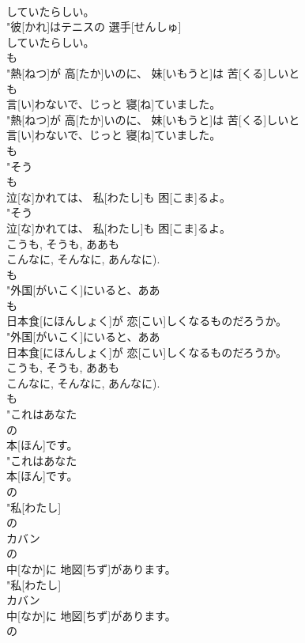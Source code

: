 \documentclass[8pt]{extreport}
\begin{document}
\begin{CJK}{UTF8}{min}
\\	していたらしい。
\\	"彼[かれ]はテニスの 選手[せんしゅ]
\\	していたらしい。
\\	も
\\	"熱[ねつ]が 高[たか]いのに、 妹[いもうと]は 苦[くる]しいと
\\	も
\\	言[い]わないで、じっと 寝[ね]ていました。
\\	"熱[ねつ]が 高[たか]いのに、 妹[いもうと]は 苦[くる]しいと
\\	言[い]わないで、じっと 寝[ね]ていました。
\\	も
\\	"そう
\\	も
\\	泣[な]かれては、 私[わたし]も 困[こま]るよ。
\\	"そう
\\	泣[な]かれては、 私[わたし]も 困[こま]るよ。
\\	こうも, そうも, ああも 
\\	こんなに, そんなに, あんなに).	
\\	も
\\	"外国[がいこく]にいると、ああ
\\	も
\\	日本食[にほんしょく]が 恋[こい]しくなるものだろうか。
\\	"外国[がいこく]にいると、ああ
\\	日本食[にほんしょく]が 恋[こい]しくなるものだろうか。
\\	こうも, そうも, ああも 
\\	こんなに, そんなに, あんなに).	
\\	も
\\	"これはあなた
\\	の
\\	本[ほん]です。
\\	"これはあなた
\\	本[ほん]です。
\\	の
\\	"私[わたし]
\\	の
\\	カバン
\\	の
\\	中[なか]に 地図[ちず]があります。
\\	"私[わたし]
\\	カバン
\\	中[なか]に 地図[ちず]があります。
\\	の

\end{CJK}
\end{document}
